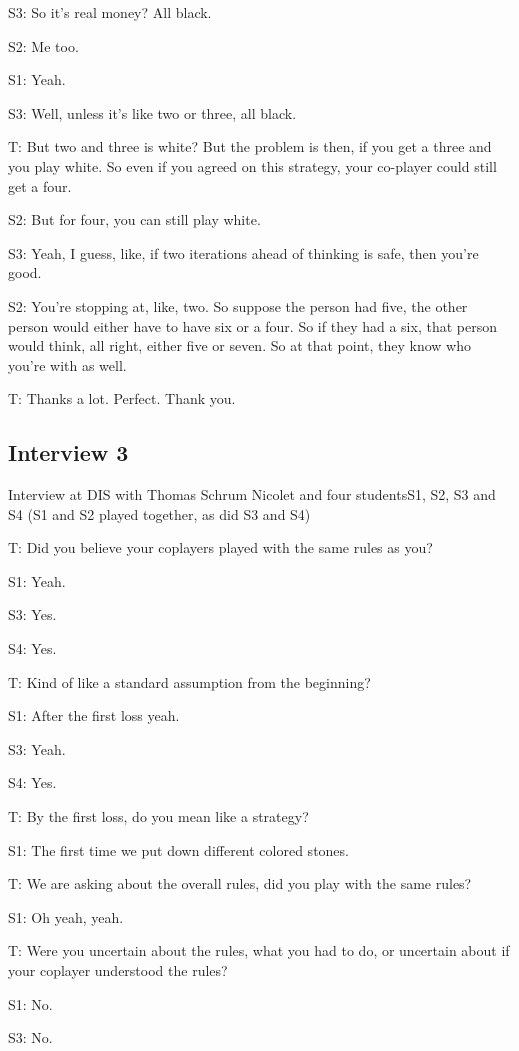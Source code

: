 \documentclass[a4paper,superscriptaddress,nofootinbib]{revtex4}
\begin{document}
S3: So it's real money? All black. 

S2: Me too.

S1: Yeah. 

S3: Well, unless it's like two or three, all black.

T: But two and three is white? But the problem is then, if you get a three and you play white. So even if you agreed on this strategy, your co-player could still get a four.

S2: But for four, you can still play white.

S3: Yeah, I guess, like, if two iterations ahead of thinking is safe, then you're good. 

S2: You're stopping at, like, two. So suppose the person had five, the other person would either have to have six or a four. So if they had a six, that person would think, all right, either five or seven. So at that point, they know who you're with as well. 

T: Thanks a lot. Perfect. Thank you.


\subsection*{Interview 3}
Interview at DIS with Thomas Schrum Nicolet and four studentsS1, S2, S3 and S4 (S1 and S2 played together, as did S3 and S4)

\medskip
T: Did you believe your coplayers played with the same rules as you?

S1: Yeah.

S3: Yes.

S4: Yes.

T: Kind of like a standard assumption from the beginning?

S1: After the first loss yeah.

S3: Yeah.

S4: Yes.

T: By the first loss, do you mean like a strategy?

S1: The first time we put down different colored stones.

T: We are asking about the overall rules, did you play with the same rules?

S1: Oh yeah, yeah.

T: Were you uncertain about the rules, what you had to do, or uncertain about if your coplayer understood the rules?

S1: No.

S3: No.
\end{document}
